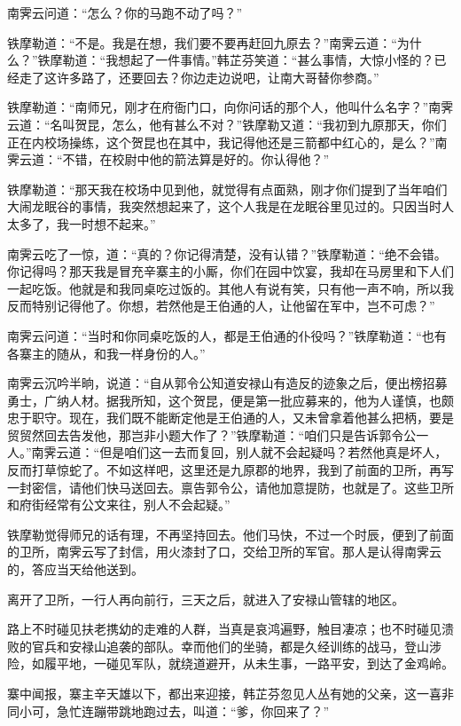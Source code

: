\documentclass[12pt,oneside]{book}
\begin{document}
南霁云问道：``怎么？你的马跑不动了吗？''

铁摩勒道：``不是。我是在想，我们要不要再赶回九原去？''南霁云道：``为什么？''铁摩勒道：``我想起了一件事情。''韩芷芬笑道：``甚么事情，大惊小怪的？已经走了这许多路了，还要回去？你边走边说吧，让南大哥替你参商。''

铁摩勒道：``南师兄，刚才在府衙门口，向你问话的那个人，他叫什么名字？''南霁云道：``名叫贺昆，怎么，他有甚么不对？''铁摩勒又道：``我初到九原那天，你们正在内校场操练，这个贺昆也在其中，我记得他还是三箭都中红心的，是么？''南霁云道：``不错，在校尉中他的箭法算是好的。你认得他？''

铁摩勒道：``那天我在校场中见到他，就觉得有点面熟，刚才你们提到了当年咱们大闹龙眠谷的事情，我突然想起来了，这个人我是在龙眠谷里见过的。只因当时人太多了，我一时想不起来。''

南霁云吃了一惊，道：``真的？你记得清楚，没有认错？''铁摩勒道：``绝不会错。你记得吗？那天我是冒充辛寨主的小厮，你们在园中饮宴，我却在马房里和下人们一起吃饭。他就是和我同桌吃过饭的。其他人有说有笑，只有他一声不响，所以我反而特别记得他了。你想，若然他是王伯通的人，让他留在军中，岂不可虑？''

南霁云问道：``当时和你同桌吃饭的人，都是王伯通的仆役吗？''铁摩勒道：``也有各寨主的随从，和我一样身份的人。''

南霁云沉吟半晌，说道：``自从郭令公知道安禄山有造反的迹象之后，便出榜招募勇士，广纳人材。据我所知，这个贺昆，便是第一批应募来的，他为人谨慎，也颇忠于职守。现在，我们既不能断定他是王伯通的人，又未曾拿着他甚么把柄，要是贸贸然回去告发他，那岂非小题大作了？''铁摩勒道：``咱们只是告诉郭令公一人。''南霁云道：``但是咱们这一去而复回，别人就不会起疑吗？若然他真是坏人，反而打草惊蛇了。不如这样吧，这里还是九原郡的地界，我到了前面的卫所，再写一封密信，请他们快马送回去。禀告郭令公，请他加意提防，也就是了。这些卫所和府街经常有公文来往，别人不会起疑。''

铁摩勒觉得师兄的话有理，不再坚持回去。他们马快，不过一个时辰，便到了前面的卫所，南霁云写了封信，用火漆封了口，交给卫所的军官。那人是认得南霁云的，答应当天给他送到。

离开了卫所，一行人再向前行，三天之后，就进入了安禄山管辖的地区。

路上不时碰见扶老携幼的走难的人群，当真是哀鸿遍野，触目凄凉；也不时碰见溃败的官兵和安禄山追袭的部队。幸而他们的坐骑，都是久经训练的战马，登山涉险，如履平地，一碰见军队，就绕道避开，从未生事，一路平安，到达了金鸡岭。

寨中闻报，寨主辛天雄以下，都出来迎接，韩芷芬忽见人丛有她的父亲，这一喜非同小可，急忙连蹦带跳地跑过去，叫道：``爹，你回来了？''
\end{document}
